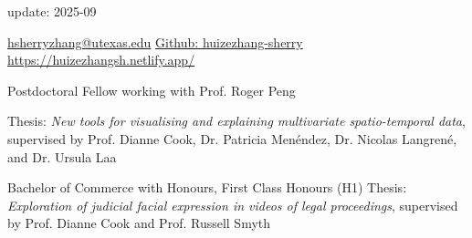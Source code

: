 \documentclass[10pt,a4paper]{article} %
\begin{document}
 


\hfill
update: 2025-09
\spacedhrule{0.2em}{-0.4em} %

\vspace{0.25cm}
\noindent
\href{mailto:hsherryzhang@utexas.edu}{hsherryzhang@utexas.edu}
\hspace{4em}
\href{https://github.com/huizezhang-sherry/}{Github: huizezhang-sherry}
\hfill
\href{https://huizezhangsh.netlify.app/}{https://huizezhangsh.netlify.app/}




    {Postdoctoral Fellow working with Prof. Roger Peng
    }

    {Thesis: \textit{New tools for visualising and explaining multivariate spatio-temporal data},
    supervised by Prof. Dianne Cook, Dr. Patricia Men\'endez, Dr. Nicolas Langren\'e, and Dr. Ursula Laa 
    }

    {Bachelor of Commerce with Honours, First Class Honours (H1) \newline
    Thesis: \textit{Exploration of judicial facial expression in videos of legal proceedings}, supervised by Prof. Dianne Cook and Prof. Russell Smyth
    }
\end{document}
